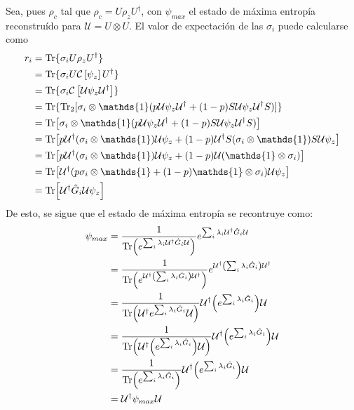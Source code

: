 \documentclass[onecolumn,11pt]{article}
\newcommand{\mcU}{\mathcal{U}}
\newcommand{\mcC}{\mathcal{C}}
\newcommand{\Id}{\mathds{1}}%
\newcommand{\CG}[1]{\mcC\left[#1\right]}
\begin{document}
Sea, pues $\rho_{c}$ tal que $\rho_{c}=U\rho_{z}U^{\dag}$, con $\psi_{max}$ el estado de máxima entropía reconstruído para  $\mcU=U\otimes U$. El valor de expectación de las $\sigma_{i}$ puede calcularse como
\begin{align*}
r_{i}&=\Tr\{\sigma_{i}U\rho_{z}U^{\dag}\}\\
&=\Tr\{\sigma_{i}U\CG{\psi_{z}}U^{\dag}\}\\
&=\Tr\{\sigma_{i}\CG{\mcU\psi_{z}\mcU^{\dag}}\}\\
&=\Tr\{\Tr_{2}[\sigma_{i}\otimes\Id(p\mcU\psi_{z}\mcU^{\dag}+(1-p)S\mcU\psi_{z}\mcU^{\dag}S)]\}\\
&=\Tr[\sigma_{i}\otimes\Id(p\mcU\psi_{z}\mcU^{\dag}+(1-p)S\mcU\psi_{z}\mcU^{\dag}S)]\\
&=\Tr[p\mcU^{\dag}(\sigma_{i}\otimes\Id)\mcU\psi_{z}+(1-p)\mcU^{\dag}S(\sigma_{i}\otimes\Id) S\mcU\psi_{z}]\\
&=\Tr[p\mcU^{\dag}(\sigma_{i}\otimes\Id)\mcU\psi_{z}+(1-p)\mcU(\Id\otimes\sigma_{i})]\\
&=\Tr[\mcU^{\dag}(p\sigma_{i}\otimes\Id+(1-p)\Id\otimes\sigma_{i})\mcU\psi_{z}]\\
&=\Tr[\mcU^{\dag}\hat{G}_{i}\mcU\psi_{z}]\\
\end{align*}
De esto, se sigue que el estado de máxima entropía se recontruye como:
\begin{align*}
\psi_{max}&=\frac{1}{\Tr(e^{\sum_{i}\lambda_{i}\mcU^{\dag}\hat{G}_{i}\mcU})}e^{\sum_{i}\lambda_{i}\mcU^{\dag}\hat{G}_{i}\mcU}\\
&=\frac{1}{\Tr(e^{\mcU^{\dag}\qty(\sum_{i}\lambda_{i}\hat{G}_{i})\mcU^{\dag}})}e^{\mcU^{\dag}\qty(\sum_{i}\lambda_{i}\hat{G}_{i})\mcU^{\dag}}\\
&=\frac{1}{\Tr(\mcU^{\dag}e^{\sum_{i}\lambda_{i}\hat{G}_{i}}\mcU)}\mcU^{\dag}\qty(e^{\sum_{i}\lambda_{i}\hat{G}_{i}})\mcU\\
&=\frac{1}{\Tr(\mcU^{\dag}\qty(e^{\sum_{i}\lambda_{i}\hat{G}_{i}})\mcU)}\mcU^{\dag}\qty(e^{\sum_{i}\lambda_{i}\hat{G}_{i}})\mcU\\
&=\frac{1}{\Tr(e^{\sum_{i}\lambda_{i}\hat{G}_{i}})}\mcU^{\dag}\qty(e^{\sum_{i}\lambda_{i}\hat{G}_{i}})\mcU\\
&=\mcU^{\dag}\psi_{max}\mcU
\end{align*}
\end{document}
